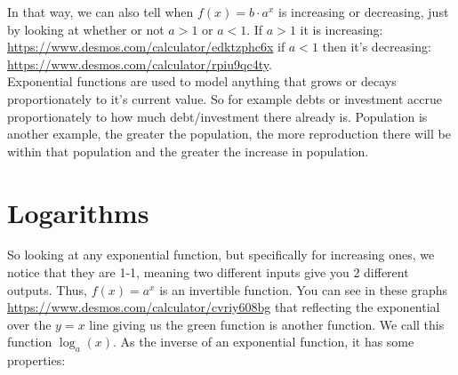 In that way, we can also tell when $f(x)=b\cdot a^x$ is increasing or decreasing, just by looking at whether or not $a>1$ or $a<1$.  If $a>1$ it is increasing: \url{https://www.desmos.com/calculator/edktzphc6x} if $a<1$ then it's decreasing: \url{https://www.desmos.com/calculator/rpiu9qc4ty}.\\


Exponential functions are used to model anything that grows or decays proportionately to  it's current value.  So for example debts or investment accrue proportionately to how much debt/investment there already is.  Population is another example, the greater the population, the more reproduction there will be within that population and the greater the increase in population.

\section{Logarithms}\label{Section:Logarithms}

So looking at any exponential function, but specifically for increasing ones, we notice that they are 1-1, meaning two different inputs give you 2 different outputs.  Thus, $f(x)=a^x$ is an invertible function.  You can see in these graphs \url{https://www.desmos.com/calculator/cvriy608bg} that reflecting the exponential over the $y=x$ line giving us the green function is another function.  We call this function $\log_a(x)$.  As the inverse of an exponential function, it has some properties:

